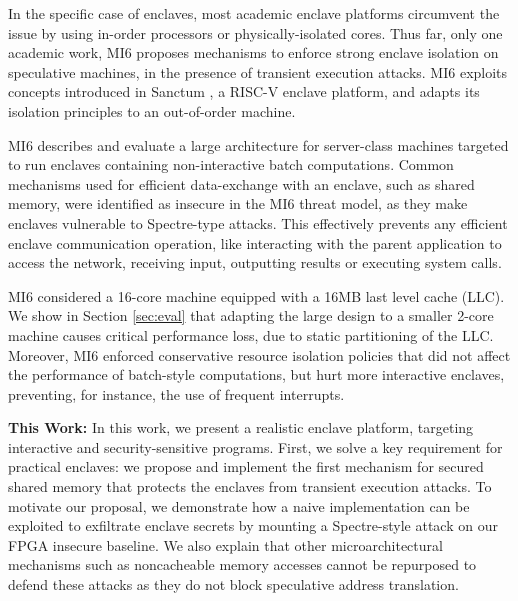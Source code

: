 In the specific case of enclaves, most academic enclave platforms \cite{lee2020keystone, bahmani2021cure, nasahl2021hector, costan2016sanctum} circumvent the issue by using in-order processors or physically-isolated cores.
Thus far, only one academic work, MI6 \cite{bourgeat2019mi6} proposes mechanisms to enforce strong enclave isolation on speculative machines, in the presence of transient execution attacks.
MI6 exploits concepts introduced in Sanctum \cite{costan2016sanctum}, a RISC-V enclave platform, and adapts its isolation principles to an out-of-order machine.

MI6 describes and evaluate a large architecture for server-class machines targeted to run enclaves containing non-interactive batch computations. 
Common mechanisms used for efficient data-exchange with an enclave, such as shared memory, were identified as insecure in the MI6 threat model, as they make enclaves vulnerable to Spectre-type attacks.
This effectively prevents any efficient enclave communication operation, like interacting with the parent application to access the network, receiving input, outputting results or executing system calls.

MI6 considered a 16-core machine equipped with a 16MB last level cache (LLC).
We show in Section \ref{sec:eval} that adapting the large design to a smaller 2-core machine causes critical performance loss, due to static partitioning of the LLC.
Moreover, MI6 enforced conservative resource isolation policies that did not affect the performance of batch-style computations, but hurt more interactive enclaves, preventing, for instance, the use of frequent interrupts.

\textbf{This Work:} In this work, we present a realistic enclave platform, targeting interactive and security-sensitive programs.
First, we solve a key requirement for practical enclaves: we propose and implement the first mechanism for secured shared memory that protects the enclaves from transient execution attacks.
To motivate our proposal, we demonstrate how a naive implementation can be exploited to exfiltrate enclave secrets by mounting a Spectre-style attack on our FPGA insecure baseline.
We also explain that other microarchitectural mechanisms such as noncacheable memory accesses cannot be repurposed to defend these attacks as they do not block speculative address translation.

